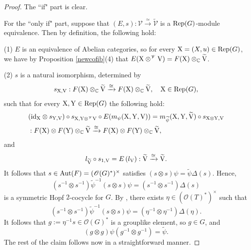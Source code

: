 \documentclass{amsart}
\theoremstyle{definition}
\newcommand{\id}{{\rm id}}
\newcommand{\Rep}{{\rm Rep}}
\newcommand{\V}{\mathscr{V}}
\newcommand{\ot}{\otimes}
\numberwithin{equation}{section}
\begin{document}
\begin{proof}
The ``if" part is clear.

For the ``only if" part, suppose that 
$(E,s):\V\xrightarrow{\simeq}\widetilde{\V}$ is a $\Rep(G)$-module equivalence. Then by definition, the following hold:

(1) $E$ is an equivalence of Abelian categories, so for every ${\rm X}=(X,u)\in \Rep(G)$, we have by Proposition \ref{newcofib}(4) that 
$E({\rm X} \ot ^{\V}{\rm V})=F({\rm X})\ot_{\mathbb{C}}\widetilde{{\rm V}}$.

(2) $s$ is a natural isomorphism, determined by 
\begin{equation*}
s_{{\rm X},{\rm V}}:F({\rm X})\ot_{\mathbb{C}}\widetilde{{\rm V}}\xrightarrow{\cong}F({\rm X})\ot_{\mathbb{C}}\widetilde{{\rm V}},\quad {\rm X}\in \Rep(G),
\end{equation*}
such that for every ${\rm X},{\rm Y}\in \Rep(G)$ the following hold:
\begin{equation*}
\begin{split}
& (\id_{{\rm X}}\ot s_{{\rm Y},{\rm V}})\circ s_{{\rm X},{\rm Y} \ot ^{\V}{\rm V}}\circ E(m_{\psi}({\rm X},{\rm Y},{\rm V}))=m_{\widetilde{\psi}}({\rm X},{\rm Y},\widetilde{{\rm V}})\circ s_{{\rm X}\ot {\rm Y},{\rm V}}\\
& :F({\rm X})\ot F({\rm Y})\ot_{\mathbb{C}}\widetilde{{\rm V}} \xrightarrow{\cong} F({\rm X})\ot F({\rm Y})\ot_{\mathbb{C}}\widetilde{{\rm V}},
\end{split}
\end{equation*}
and
\begin{equation*}
l_{\widetilde{{\rm V}}}\circ s_{1,{\rm V}}=E\left(l_{{\rm V}}\right): \widetilde{{\rm V}}\xrightarrow{\cong} 
\widetilde{{\rm V}}.
\end{equation*}
It follows that $s\in {\rm Aut}(F)=(\mathscr{O}(G)^*)^{\times}$ satisfies $(s\ot s)\psi=\widetilde{\psi}\Delta(s)$. Hence, 
$$(s^{-1}\ot s^{-1})\widetilde{\psi}^{-1}(s\ot s)\psi=(s^{-1}\ot s^{-1})\Delta(s)$$ 
is a symmetric Hopf $2$-cocycle for $G$. By \cite{DM}, there exists $\eta\in (\mathscr{O}(T)^*)^{\times}$ such that
$$(s^{-1}\ot s^{-1})\widetilde{\psi}^{-1}(s\ot s)\psi=(\eta^{-1}\ot \eta^{-1})\Delta(\eta).$$
It follows that $g:=\eta^{-1}s\in \mathscr{O}(G)^*$ is a grouplike element, so $g\in G$, and
$$(g\ot g)\psi(g^{-1}\ot g^{-1})=\widetilde{\psi}.$$
The rest of the claim follows now in a straightforward manner.
\end{proof}
\end{document}
